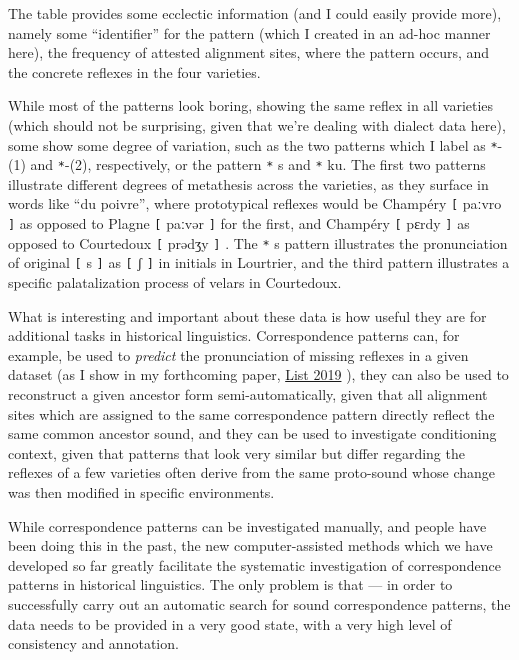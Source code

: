 \documentclass[
  a4paper,
  14pt,
  oneside,
  tablecaptionabove
]{scrbook}
\newcommand{\passthrough}[1]{#1}
\begin{document}
The table provides some ecclectic information (and I could easily
provide more), namely some \enquote{identifier} for the pattern (which I
created in an ad-hoc manner here), the frequency of attested alignment
sites, where the pattern occurs, and the concrete reflexes in the four
varieties.

While most of the patterns look boring, showing the same reflex in all
varieties (which should not be surprising, given that we're dealing with
dialect data here), some show some degree of variation, such as the two
patterns which I label as \passthrough{\lstinline!*!}-(1) and
\passthrough{\lstinline!*!}-(2), respectively, or the pattern
\passthrough{\lstinline!*!} s and \passthrough{\lstinline!*!} ku. The
first two patterns illustrate different degrees of metathesis across the
varieties, as they surface in words like \enquote{du poivre}, where
prototypical reflexes would be Champéry \passthrough{\lstinline![!}
paːvro \passthrough{\lstinline!]!} as opposed to Plagne
\passthrough{\lstinline![!} paːvər \passthrough{\lstinline!]!} for the
first, and Champéry \passthrough{\lstinline![!} pɛrdy
\passthrough{\lstinline!]!} as opposed to Courtedoux
\passthrough{\lstinline![!} prədʒy \passthrough{\lstinline!]!} . The
\passthrough{\lstinline!*!} s pattern illustrates the pronunciation of
original \passthrough{\lstinline![!} s \passthrough{\lstinline!]!} as
\passthrough{\lstinline![!} ʃ \passthrough{\lstinline!]!} in initials in
Lourtrier, and the third pattern illustrates a specific palatalization
process of velars in Courtedoux.

What is interesting and important about these data is how useful they
are for additional tasks in historical linguistics. Correspondence
patterns can, for example, be used to \emph{predict} the pronunciation
of missing reflexes in a given dataset (as I show in my forthcoming
paper, \href{http://bibliography.lingpy.org?key=List2019a}{List 2019} ),
they can also be used to reconstruct a given ancestor form
semi-automatically, given that all alignment sites which are assigned to
the same correspondence pattern directly reflect the same common
ancestor sound, and they can be used to investigate conditioning
context, given that patterns that look very similar but differ regarding
the reflexes of a few varieties often derive from the same proto-sound
whose change was then modified in specific environments.

While correspondence patterns can be investigated manually, and people
have been doing this in the past, the new computer-assisted methods
which we have developed so far greatly facilitate the systematic
investigation of correspondence patterns in historical linguistics. The
only problem is that --- in order to successfully carry out an automatic
search for sound correspondence patterns, the data needs to be provided
in a very good state, with a very high level of consistency and
annotation.
\end{document}
